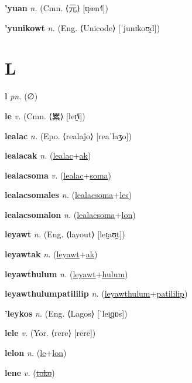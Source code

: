 \textbf{\hypertarget{'yuan}{'yuan}} \textit{n.} (Cmn. ⟨{\chinese{}元}⟩ [ɥæn˧˥])


\textbf{\hypertarget{'yunikowt}{'yunikowt}} \textit{n.} (Eng. ⟨Unicode⟩ [ˈjunɪkoʊ̯d])


\section{L}

\textbf{\hypertarget{l}{l}} \textit{pn.} (∅)


\textbf{\hypertarget{le}{le}} \textit{v.} (Cmn. ⟨{\chinese{}累}⟩ [leɪ̯˥˩])


\textbf{\hypertarget{lealac}{lealac}} \textit{n.} (Epo. ⟨realaĵo⟩ [reaˈlaʒo])


\textbf{\hypertarget{lealacak}{lealacak}} \textit{n.} (\hyperlink{lealac}{lealac}+\allowbreak \hyperlink{ak}{ak})


\textbf{\hypertarget{lealacsoma}{lealacsoma}} \textit{v.} (\hyperlink{lealac}{lealac}+\allowbreak \hyperlink{soma}{soma})


\textbf{\hypertarget{lealacsomales}{lealacsomales}} \textit{n.} (\hyperlink{lealacsoma}{lealacsoma}+\allowbreak \hyperlink{les}{les})


\textbf{\hypertarget{lealacsomalon}{lealacsomalon}} \textit{n.} (\hyperlink{lealacsoma}{lealacsoma}+\allowbreak \hyperlink{lon}{lon})


\textbf{\hypertarget{leyawt}{leyawt}} \textit{n.} (Eng. ⟨layout⟩ [leɪ̯aʊ̯t])


\textbf{\hypertarget{leyawtak}{leyawtak}} \textit{n.} (\hyperlink{leyawt}{leyawt}+\allowbreak \hyperlink{ak}{ak})


\textbf{\hypertarget{leyawthulum}{leyawthulum}} \textit{n.} (\hyperlink{leyawt}{leyawt}+\allowbreak \hyperlink{hulum}{hulum})


\textbf{\hypertarget{leyawthulumpatililip}{leyawthulumpatililip}} \textit{n.} (\hyperlink{leyawthulum}{leyawthulum}+\allowbreak \hyperlink{patililip}{patililip})


\textbf{\hypertarget{'leykos}{'leykos}} \textit{n.} (Eng. ⟨Lagos⟩ [ˈleɪ̯ɡɒs])


\textbf{\hypertarget{lele}{lele}} \textit{v.} (Yor. ⟨rere⟩ [rērē])


\textbf{\hypertarget{lelon}{lelon}} \textit{n.} (\hyperlink{le}{le}+\allowbreak \hyperlink{lon}{lon})


\textbf{\hypertarget{lene}{lene}} \textit{v.} (\hyperlink{toko}{\sout{toko}})


